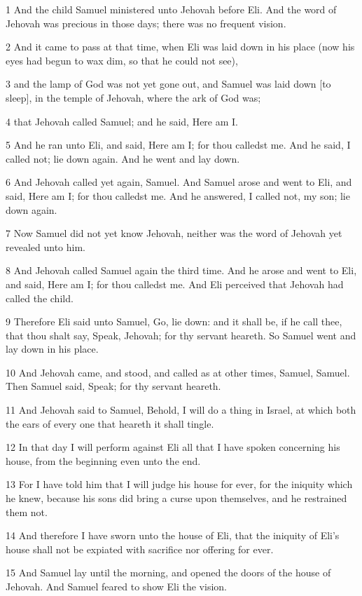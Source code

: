 \par 1 And the child Samuel ministered unto Jehovah before Eli. And the word of Jehovah was precious in those days; there was no frequent vision.
\par 2 And it came to pass at that time, when Eli was laid down in his place (now his eyes had begun to wax dim, so that he could not see),
\par 3 and the lamp of God was not yet gone out, and Samuel was laid down [to sleep], in the temple of Jehovah, where the ark of God was;
\par 4 that Jehovah called Samuel; and he said, Here am I.
\par 5 And he ran unto Eli, and said, Here am I; for thou calledst me. And he said, I called not; lie down again. And he went and lay down.
\par 6 And Jehovah called yet again, Samuel. And Samuel arose and went to Eli, and said, Here am I; for thou calledst me. And he answered, I called not, my son; lie down again.
\par 7 Now Samuel did not yet know Jehovah, neither was the word of Jehovah yet revealed unto him.
\par 8 And Jehovah called Samuel again the third time. And he arose and went to Eli, and said, Here am I; for thou calledst me. And Eli perceived that Jehovah had called the child.
\par 9 Therefore Eli said unto Samuel, Go, lie down: and it shall be, if he call thee, that thou shalt say, Speak, Jehovah; for thy servant heareth. So Samuel went and lay down in his place.
\par 10 And Jehovah came, and stood, and called as at other times, Samuel, Samuel. Then Samuel said, Speak; for thy servant heareth.
\par 11 And Jehovah said to Samuel, Behold, I will do a thing in Israel, at which both the ears of every one that heareth it shall tingle.
\par 12 In that day I will perform against Eli all that I have spoken concerning his house, from the beginning even unto the end.
\par 13 For I have told him that I will judge his house for ever, for the iniquity which he knew, because his sons did bring a curse upon themselves, and he restrained them not.
\par 14 And therefore I have sworn unto the house of Eli, that the iniquity of Eli's house shall not be expiated with sacrifice nor offering for ever.
\par 15 And Samuel lay until the morning, and opened the doors of the house of Jehovah. And Samuel feared to show Eli the vision.
